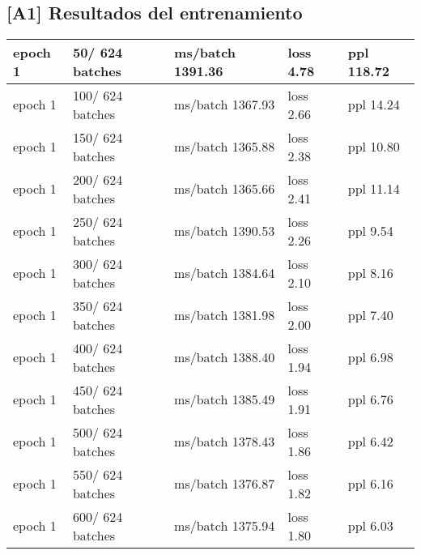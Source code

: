 \usepackage{array}
\\ \hline
\subsection*{[A1] Resultados del entrenamiento}
\begin{center}
\begin{tabular}{ | m{3cm} | m{3cm}| m{4cm} | m{3cm} | m{3cm} | } 
\hline
epoch   1 &    50/  624 batches & ms/batch 1391.36 & loss  4.78 & ppl   118.72\\ 
\hline
epoch   1 &   100/  624 batches & ms/batch 1367.93 & loss  2.66 & ppl    14.24\\ 
\hline
epoch   1 &   150/  624 batches & ms/batch 1365.88 & loss  2.38 & ppl    10.80\\ 
\hline
epoch   1 &   200/  624 batches & ms/batch 1365.66 & loss  2.41 & ppl    11.14\\ 
\hline
epoch   1 &   250/  624 batches & ms/batch 1390.53 & loss  2.26 & ppl     9.54\\ 
\hline
epoch   1 &   300/  624 batches & ms/batch 1384.64 & loss  2.10 & ppl     8.16\\ 
\hline
epoch   1 &   350/  624 batches & ms/batch 1381.98 & loss  2.00 & ppl     7.40\\ 
\hline
epoch   1 &   400/  624 batches & ms/batch 1388.40 & loss  1.94 & ppl     6.98\\ 
\hline
epoch   1 &   450/  624 batches & ms/batch 1385.49 & loss  1.91 & ppl     6.76\\ 
\hline
epoch   1 &   500/  624 batches & ms/batch 1378.43 & loss  1.86 & ppl     6.42\\ 
\hline
epoch   1 &   550/  624 batches & ms/batch 1376.87 & loss  1.82 & ppl     6.16\\ 
\hline
epoch   1 &   600/  624 batches & ms/batch 1375.94 & loss  1.80 & ppl     6.03\\ 
\hline


\end{tabular}
\end{center}
